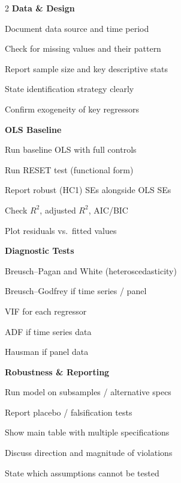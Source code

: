 \documentclass[10pt,a4paper]{article}
\begin{document}
\begin{tcolorbox}[colback=LightBlue, colframe=NavyBlue, arc=3pt, boxrule=0.8pt,
  title={\bfseries\color{white} Before You Submit: Run Through All of These}, fonttitle=\small]
\begin{multicols}{2}
\textbf{Data \& Design}
\begin{checklist}
  \item Document data source and time period
  \item Check for missing values and their pattern
  \item Report sample size and key descriptive stats
  \item State identification strategy clearly
  \item Confirm exogeneity of key regressors
\end{checklist}

\textbf{OLS Baseline}
\begin{checklist}
  \item Run baseline OLS with full controls
  \item Run RESET test (functional form)
  \item Report robust (HC1) SEs alongside OLS SEs
  \item Check $R^2$, adjusted $R^2$, AIC/BIC
  \item Plot residuals vs.\ fitted values
\end{checklist}

\columnbreak

\textbf{Diagnostic Tests}
\begin{checklist}
  \item Breusch--Pagan and White (heteroscedasticity)
  \item Breusch--Godfrey if time series / panel
  \item VIF for each regressor
  \item ADF if time series data
  \item Hausman if panel data
\end{checklist}

\textbf{Robustness \& Reporting}
\begin{checklist}
  \item Run model on subsamples / alternative specs
  \item Report placebo / falsification tests
  \item Show main table with multiple specifications
  \item Discuss direction and magnitude of violations
  \item State which assumptions cannot be tested
\end{checklist}
\end{multicols}
\end{tcolorbox}
\end{document}
